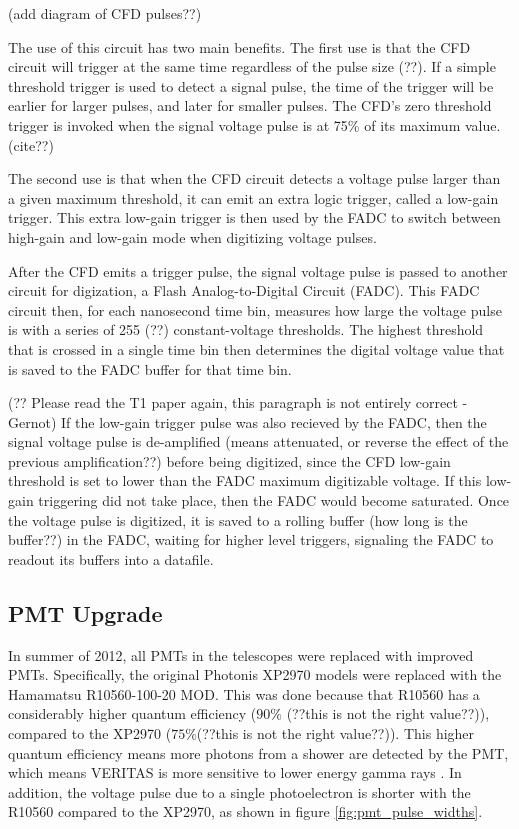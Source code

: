 {\color{red}(add diagram of CFD pulses??)}

The use of this circuit has two main benefits.
{\color{red} The first use is that the CFD circuit will trigger at the same time regardless of the pulse size (??).}
If a simple threshold trigger is used to detect a signal pulse, the time of the trigger will be earlier for larger pulses, and later for smaller pulses.
The CFD's zero threshold trigger is invoked when the signal voltage pulse is at 75\% of its maximum value. {\color{red}(cite??)}

The second use is that when the CFD circuit detects a voltage pulse larger than a given maximum threshold, it can emit an extra logic trigger, called a low-gain trigger.
This extra low-gain trigger is then used by the FADC to switch between high-gain and low-gain mode when digitizing voltage pulses.




After the CFD emits a trigger pulse, the signal voltage pulse is passed to another circuit for digization, a Flash Analog-to-Digital Circuit (FADC).
This FADC circuit then, for each nanosecond time bin, measures how large the voltage pulse is with a series of 255 {\color{red}(??)} constant-voltage thresholds.
The highest threshold that is crossed in a single time bin then determines the digital voltage value that is saved to the FADC buffer for that time bin.

{\color{red}(?? Please read the T1 paper again, this paragraph is not entirely correct -Gernot)}
If the low-gain trigger pulse was also recieved by the FADC, then the signal voltage pulse is de-amplified {\color{red}(means attenuated, or reverse the effect of the previous amplification??)} before being digitized, since the CFD low-gain threshold is set to lower than the FADC maximum digitizable voltage.
If this low-gain triggering did not take place, then the FADC would become saturated.
Once the voltage pulse is digitized, it is saved to a rolling buffer {\color{red}(how long is the buffer??)} in the FADC, waiting for higher level triggers, signaling the FADC to readout its buffers into a datafile.

\subsection{PMT Upgrade}
In summer of 2012, all PMTs in the telescopes were replaced with improved PMTs.
Specifically, the original Photonis XP2970 models were replaced with the Hamamatsu R10560-100-20 MOD.
This was done because that R10560 has a considerably higher quantum efficiency (\nicetilde$90\%$ {\color{red}(??this is not the right value??)}), compared to the XP2970 (\nicetilde$75\%${\color{red}(??this is not the right value??)}).
This higher quantum efficiency means more photons from a shower are detected by the PMT, which means VERITAS is more sensitive to lower energy gamma rays \cite{pmtmodels}.
In addition, the voltage pulse due to a single photoelectron is shorter with the R10560 compared to the XP2970, as shown in figure \ref{fig:pmt_pulse_widths}.

